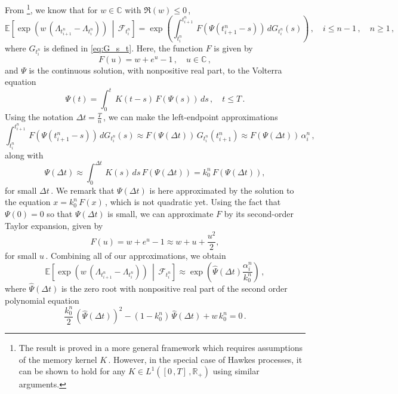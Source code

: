 \documentclass{article}
\newcommand{\R}{\mathbb{R}}
\newcommand{\1}{\mathbbm{1}}
\numberwithin{equation}{section}
\begin{document}
From \citet[Example~2.3]{abi2021weak}\footnote{The result is proved in a more general framework which requires assumptions of the memory kernel $K\,$. However, in the special case of Hawkes processes, it can be shown to hold for any $K \in L^1([0\,,T]\,, \R_+)$ using similar arguments.}, we know that for $w \in \mathbb C$ with $\Re(w) \leq 0\,$, 
$$
\mathbb E \left[\exp\left(w\, \left(\Lambda_{t^n_{i+1}} - \Lambda_{t^n_i}\right)\right)\,\middle|\, \mathcal F_{t^n_i} \right] = \exp\left(\int_{t^n_i}^{t^n_{i+1}}\,F(\Psi(t^n_{i+1} - s))\,dG_{t^n_i}(s)\right)\,, \quad i \leq n-1\,,\quad n \geq 1\,,
$$
where $G_{t^n_i}$ is defined in \eqref{eq:G_s_t}. Here, the function $F$ is given by
\begin{equation}\label{eq:F_def}
    F(u) = w + e^{u} - 1\,, \quad u \in \mathbb C\,,
\end{equation}
and $\Psi$ is the continuous solution, with nonpositive real part, to the Volterra equation 
$$
\Psi(t) = \int_0^t\,K(t-s)\,F(\Psi(s))\,ds\,, \quad t \leq T\,.
$$
Using the notation $\Delta t = \frac{T}{n}\,$, we can make the left-endpoint approximations 
\begin{equation}\label{eq:FdG_approx}
    \int_{t^n_i}^{t^n_{i+1}}\,F(\Psi(t^n_{i+1} - s))\,dG_{t^n_i}(s) \approx F(\Psi(\Delta t))\,G_{t^n_i}(t^n_{i+1}) \approx F(\Psi(\Delta t))\,\alpha^n_i \,,
\end{equation}
along with
\begin{equation}\label{eq:Psi_approx}
    \Psi(\Delta t) \approx \int_0^{\Delta t}\,K(s) \, ds\,F(\Psi(\Delta t)) = k_0^n\,F(\Psi(\Delta t)) ,
\end{equation}
for small $\Delta t\,$. We remark that $\Psi(\Delta t)$ is here approximated by the solution to the equation $x = k_0^n\,F(x)\,$, which is not quadratic yet. Using the fact that $\Psi(0) = 0$ so that $\Psi(\Delta t)$ is small, we can approximate $F$ by its second-order Taylor expansion, given by
\begin{equation}\label{eq:F_approx}
    F(u) = w + e^u - 1\approx w + u + \dfrac{u^2}{2},
\end{equation}
for small $u\,$. Combining all of our approximations, we obtain
$$
\mathbb E \left[\exp\left(w\, \left(\Lambda_{t^n_{i+1}} - \Lambda_{t^n_{i}}\right) \right)\,\middle|\, \mathcal F_{t^n_i} \right] \approx \exp\left(\widehat \Psi(\Delta t) \frac{\alpha^n_i}{k_0^n} \right) \,,
$$
where $\widehat \Psi(\Delta t)$ is the zero root with nonpositive real part of the second order polynomial equation
$$
\frac{k_0^n}{2}\,\left(\widehat \Psi(\Delta t)\right)^2 - (1 - k_0^n)\,\widehat \Psi(\Delta t) + w\,k_0^n = 0 \,.
$$
\end{document}
